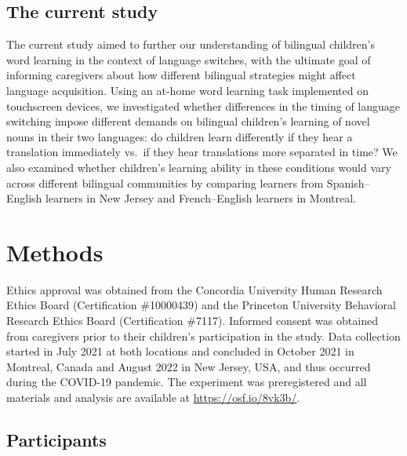 \documentclass[
  man,floatsintext]{apa7}
\begin{document}
\hypertarget{the-current-study}{%
\subsection{The current study}\label{the-current-study}}

The current study aimed to further our understanding of bilingual children's word learning in the context of language switches, with the ultimate goal of informing caregivers about how different bilingual strategies might affect language acquisition. Using an at-home word learning task implemented on touchscreen devices, we investigated whether differences in the timing of language switching impose different demands on bilingual children's learning of novel nouns in their two languages: do children learn differently if they hear a translation immediately vs.~if they hear translations more separated in time? We also examined whether children's learning ability in these conditions would vary across different bilingual communities by comparing learners from Spanish--English learners in New Jersey and French--English learners in Montreal.

\hypertarget{methods}{%
\section{Methods}\label{methods}}

Ethics approval was obtained from the Concordia University Human Research Ethics Board (Certification \#10000439) and the Princeton University Behavioral Research Ethics Board (Certification \#7117). Informed consent was obtained from caregivers prior to their children's participation in the study. Data collection started in July 2021 at both locations and concluded in October 2021 in Montreal, Canada and August 2022 in New Jersey, USA, and thus occurred during the COVID-19 pandemic. The experiment was preregistered and all materials and analysis are available at \url{https://osf.io/8vk3b/}.

\hypertarget{participants}{%
\subsection{Participants}\label{participants}}
\end{document}

